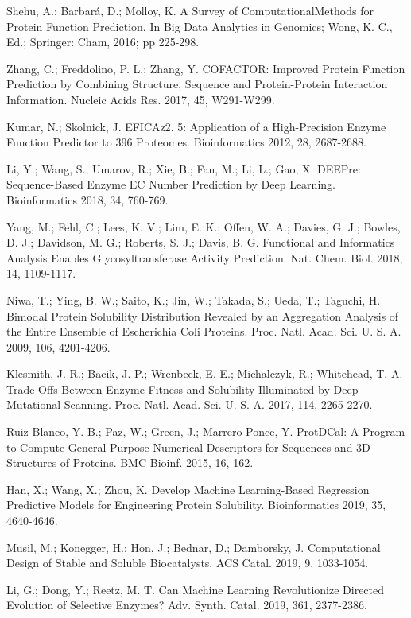 \documentclass[12pt]{article}
\begin{document}
\begin{thebibliography}{99}
 Shehu, A.; Barbará, D.; Molloy, K. A Survey of ComputationalMethods for Protein Function Prediction. In Big Data Analytics in Genomics; Wong, K. C., Ed.; Springer: Cham, 2016; pp 225-298.

 Zhang, C.; Freddolino, P. L.; Zhang, Y. COFACTOR: Improved Protein Function Prediction by Combining Structure, Sequence and Protein-Protein Interaction Information. Nucleic Acids Res. 2017, 45, W291-W299.

 Kumar, N.; Skolnick, J. EFICAz2. 5: Application of a High-Precision Enzyme Function Predictor to 396 Proteomes. Bioinformatics 2012, 28, 2687-2688.

 Li, Y.; Wang, S.; Umarov, R.; Xie, B.; Fan, M.; Li, L.; Gao, X. DEEPre: Sequence-Based Enzyme EC Number Prediction by Deep Learning. Bioinformatics 2018, 34, 760-769.

 Yang, M.; Fehl, C.; Lees, K. V.; Lim, E. K.; Offen, W. A.; Davies, G. J.; Bowles, D. J.; Davidson, M. G.; Roberts, S. J.; Davis, B. G. Functional and Informatics Analysis Enables Glycosyltransferase Activity Prediction. Nat. Chem. Biol. 2018, 14, 1109-1117.

 Niwa, T.; Ying, B. W.; Saito, K.; Jin, W.; Takada, S.; Ueda, T.; Taguchi, H. Bimodal Protein Solubility Distribution Revealed by an Aggregation Analysis of the Entire Ensemble of Escherichia Coli Proteins. Proc. Natl. Acad. Sci. U. S. A. 2009, 106, 4201-4206.

 Klesmith, J. R.; Bacik, J. P.; Wrenbeck, E. E.; Michalczyk, R.; Whitehead, T. A. Trade-Offs Between Enzyme Fitness and Solubility Illuminated by Deep Mutational Scanning. Proc. Natl. Acad. Sci. U. S. A. 2017, 114, 2265-2270.

 Ruiz-Blanco, Y. B.; Paz, W.; Green, J.; Marrero-Ponce, Y. ProtDCal: A Program to Compute General-Purpose-Numerical Descriptors for Sequences and 3D-Structures of Proteins. BMC Bioinf. 2015, 16, 162.

 Han, X.; Wang, X.; Zhou, K. Develop Machine Learning-Based Regression Predictive Models for Engineering Protein Solubility. Bioinformatics 2019, 35, 4640-4646.

 Musil, M.; Konegger, H.; Hon, J.; Bednar, D.; Damborsky, J. Computational Design of Stable and Soluble Biocatalysts. ACS Catal. 2019, 9, 1033-1054.

 Li, G.; Dong, Y.; Reetz, M. T. Can Machine Learning Revolutionize Directed Evolution of Selective Enzymes? Adv. Synth. Catal. 2019, 361, 2377-2386. 


\end{thebibliography}
\end{document}
